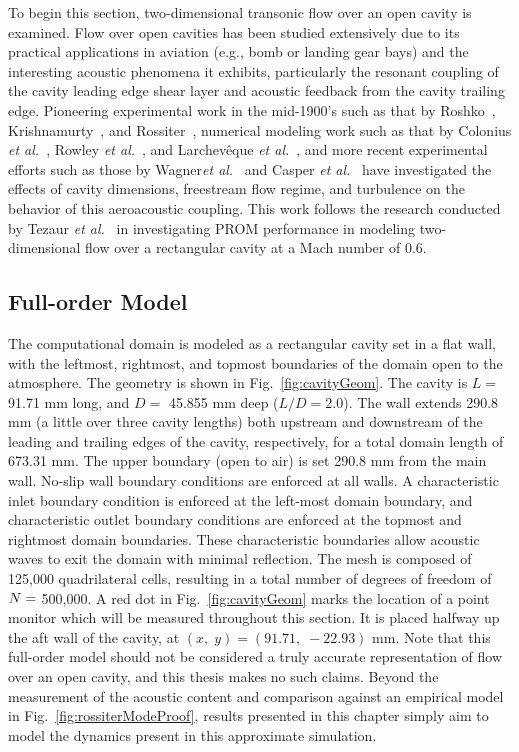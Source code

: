 

To begin this section, two-dimensional transonic flow over an open cavity is examined. Flow over open cavities has been studied extensively due to its practical applications in aviation (e.g., bomb or landing gear bays) and the interesting acoustic phenomena it exhibits, particularly the resonant coupling of the cavity leading edge shear layer and acoustic feedback from the cavity trailing edge. Pioneering experimental work in the mid-1900's such as that by Roshko~\cite{Roshko1952}, Krishnamurty~\cite{Krishnamurty1955}, and Rossiter~\cite{Rossiter1964}, numerical modeling work such as that by Colonius \textit{et al.}~\cite{Colonius1999}, Rowley \textit{et al.}~\cite{Rowley2002}, and Larchev\^{e}que \textit{et al.}~\cite{Larcheveque2007}, and more recent experimental efforts such as those by Wagner\textit{et al.}~\cite{Wagner2015} and Casper \textit{et al.}~\cite{Casper2018} have investigated the effects of cavity dimensions, freestream flow regime, and turbulence on the behavior of this aeroacoustic coupling. This work follows the research conducted by Tezaur \textit{et al.}~\cite{Tezaur2016,Tezaur2017} in investigating PROM performance in modeling two-dimensional flow over a rectangular cavity at a Mach number of 0.6.

\subsection{Full-order Model}

The computational domain is modeled as a rectangular cavity set in a flat wall, with the leftmost, rightmost, and topmost boundaries of the domain open to the atmosphere. The geometry is shown in Fig.~\ref{fig:cavityGeom}. The cavity is $L =$ 91.71 mm long, and $D =$ 45.855 mm deep ($L/D = 2.0$). The wall extends 290.8 mm (a little over three cavity lengths) both upstream and downstream of the leading and trailing edges of the cavity, respectively, for a total domain length of 673.31 mm. The upper boundary (open to air) is set 290.8 mm from the main wall. No-slip wall boundary conditions are enforced at all walls. A characteristic inlet boundary condition is enforced at the left-most domain boundary, and characteristic outlet boundary conditions are enforced at the topmost and rightmost domain boundaries. These characteristic boundaries allow acoustic waves to exit the domain with minimal reflection. The mesh is composed of 125,000 quadrilateral cells, resulting in a total number of degrees of freedom of $N =$ 500,000. A red dot in Fig.~\ref{fig:cavityGeom} marks the location of a point monitor which will be measured throughout this section. It is placed halfway up the aft wall of the cavity, at $(x, \; y) = (91.71, \; -22.93)$ mm. Note that this full-order model should not be considered a truly accurate representation of flow over an open cavity, and this thesis makes no such claims. Beyond the measurement of the acoustic content and comparison against an empirical model in Fig.~\ref{fig:rossiterModeProof}, results presented in this chapter simply aim to model the dynamics present in this approximate simulation.

